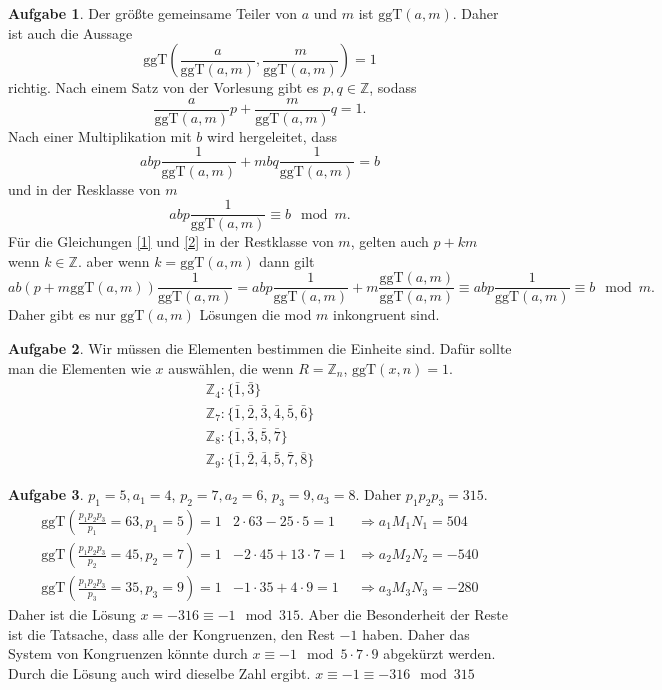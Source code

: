 \documentclass{article}
\theoremstyle{definition}
\newtheorem{ub}{Aufgabe}
\newcommand{\ggt}[2]{\mathrm{ggT}(#1,#2)}
\begin{document}
\begin{ub}
	Der gr\"o\ss te gemeinsame Teiler von $ a $ und $ m $ ist 
	$ \ggt{a}{m} $. Daher ist auch die Aussage
	\[ 
	\ggt{\frac{a}{\ggt{a}{m}}}{\frac{m}{\ggt{a}{m}}} = 1 
	 \]
	richtig. Nach einem Satz von der Vorlesung gibt es $ p,q \in \mathbb{Z} $, sodass
	\[ 
	\frac{a}{\ggt{a}{m}}p + \frac{m}{\ggt{a}{m}}q = 1. \tag{1}\label{1}
	 \]
	Nach einer Multiplikation mit $ b $ wird hergeleitet, dass
	\[ 
	abp\frac{1}{\ggt{a}{m}} + mbq\frac{1}{\ggt{a}{m}} = b
	 \]
	und in der Resklasse von $ m $
	\[ 
	abp\frac{1}{\ggt{a}{m}} \equiv b \mod m \tag{2}\label{2}.
	 \]
	F\"ur die Gleichungen \ref{1} und \ref{2} in der Restklasse von $ m $, gelten auch $ p + km $ wenn $ k \in \mathbb{Z} $. aber wenn 
	$ k = \ggt{a}{m} $ dann gilt
	\[ 
	ab(p + m\ggt{a}{m})\frac{1}{\ggt{a}{m}} = abp\frac{1}{\ggt{a}{m}} + m \frac{\ggt{a}{m}}{\ggt{a}{m}} 
	\equiv abp\frac{1}{\ggt{a}{m}} \equiv b \mod m. 
	 \]
	Daher gibt es nur $ \ggt{a}{m} $ L\"osungen die mod $ m $ inkongruent sind.
\end{ub}
\begin{ub}
	Wir m\"ussen die Elementen bestimmen die Einheite sind. Daf\"ur sollte man die Elementen wie $ x $ ausw\"ahlen, die wenn $ R = \mathbb{Z}_n $, $ \ggt{x}{n} = 1 $.
	\[ 
	\begin{array}{l}
		\mathbb{Z}_4 : \{ \bar{1}, \bar{3} \} \\
		\mathbb{Z}_7 : \{ \bar{1}, \bar{2}, \bar{3}, \bar{4}, \bar{5}, \bar{6} \} \\
		\mathbb{Z}_8 : \{ \bar{1}, \bar{3}, \bar{5}, \bar{7} \} \\
		\mathbb{Z}_9 : \{ \bar{1}, \bar{2}, \bar{4}, \bar{5}, \bar{7}, \bar{8} \}
	\end{array}
	 \]	
\end{ub}
\begin{ub}
	$ p_1 = 5, a_1 = 4 $, $ p_2 = 7, a_2 = 6 $, $ p_3 = 9, a_3 = 8 $. Daher $ p_1p_2p_3 = 315 $.
	\[ 
	\begin{array}{lrl}
		\ggt{\frac{p_1p_2p_3}{p_1} = 63}{p_1 = 5} = 1 & 2 \cdot 63 - 25 \cdot 5 = 1
		& \Rightarrow a_1M_1N_1 = 504 \\
		\ggt{\frac{p_1p_2p_3}{p_2} = 45}{p_2 = 7} = 1 & -2 \cdot 45 + 13 \cdot 7 = 1
		& \Rightarrow a_2M_2N_2 = -540 \\
		\ggt{\frac{p_1p_2p_3}{p_3} = 35}{p_3 = 9} = 1 & -1 \cdot 35 + 4 \cdot 9 = 1
		& \Rightarrow a_3M_3N_3 = -280
	\end{array}
	 \]
	 Daher ist die L\"osung $ x = -316 \equiv -1 \mod 315 $. Aber die Besonderheit der Reste ist die Tatsache, dass alle der Kongruenzen, den Rest $ -1 $ haben. Daher das System von Kongruenzen k\"onnte durch $ x \equiv -1 \mod 5 \cdot 7 \cdot 9 $ abgek\"urzt werden. Durch die L\"osung auch wird dieselbe Zahl ergibt. $ x \equiv -1 \equiv -316 \mod 315 $
\end{ub}
\end{document}
